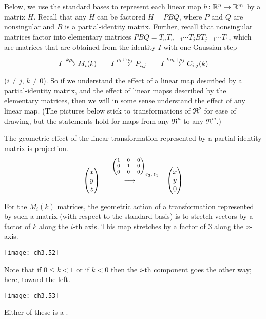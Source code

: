 Below, we use the standard bases to represent 
each linear map $\mbox{$h\colon \mathbb{R}^n\to \mathbb{R}^m$}$ by a matrix $H$.
Recall that any $H$ can be factored $H=PBQ$, 
where $P$ and $Q$ are nonsingular and $B$ is a partial-identity matrix.
Further, recall that nonsingular matrices
factor into elementary matrices
$PBQ=T_nT_{n-1}\cdots T_jBT_{j-1}\cdots T_1$,
which are matrices that
are obtained from the identity $I$ with one Gaussian step
\begin{equation*}
  I\mathrel{ \mathop{\longrightarrow}\limits^{k\rho_i\mathstrut}_{ \begin{subarray}{l} \relax \end{subarray}}}M_i(k) 
  \qquad 
  I\mathrel{ \mathop{\longrightarrow}\limits^{\rho_i\leftrightarrow\rho_j\mathstrut}_{ \begin{subarray}{l} \relax \end{subarray}}}P_{i,j}  
  \qquad
  I\mathrel{ \mathop{\longrightarrow}\limits^{k\rho_i+\rho_j\mathstrut}_{ \begin{subarray}{l} \relax \end{subarray}}}C_{i,j}(k) 
\end{equation*}
($i\neq j$, $k\neq 0$).
So if we understand the effect of a linear map described
by a partial-identity matrix, and the effect of linear mapss
described by the elementary matrices, then we will in some sense
understand the effect of any linear map.
(The pictures below stick to transformations of $\Re^2$ for ease of drawing, 
but the statements hold for maps from any $\Re^n$ to any $\Re^m$.)

The geometric effect of the linear transformation represented by a  
partial-identity matrix is projection.
\begin{equation*}
  \colvec{x \\ y  \\ z}
  \quad\begin{array}[b]{c}
    \text{\scriptsize $\begin{pmatrix}
      1  &0  &0   \\
      0  &1  &0   \\
      0  &0  &0   
    \end{pmatrix}_{\text{\makebox[0pt][l]{$\stdbasis_3,\stdbasis_3$}}}$ } \\[1.5ex]
    \longrightarrow
  \end{array}\qquad
  \colvec{x \\ y  \\ 0}
\end{equation*}

For the $M_i(k)$ matrices, 
the geometric action of a transformation represented by such a  
matrix (with respect to the standard basis) is to  
stretch vectors by a factor of $k$ along the $i$-th axis.
This map stretches by a factor of $3$ along the $x$-axis.
\begin{center}
  \texttt{[image: ch3.52]}
\end{center}
Note that if $0\leq k<1$ or if $k<0$ then the $i$-th
component goes the other way; here, toward the left.
\begin{center}
  \texttt{[image: ch3.53]}
\end{center}
Either of these is a 
.

